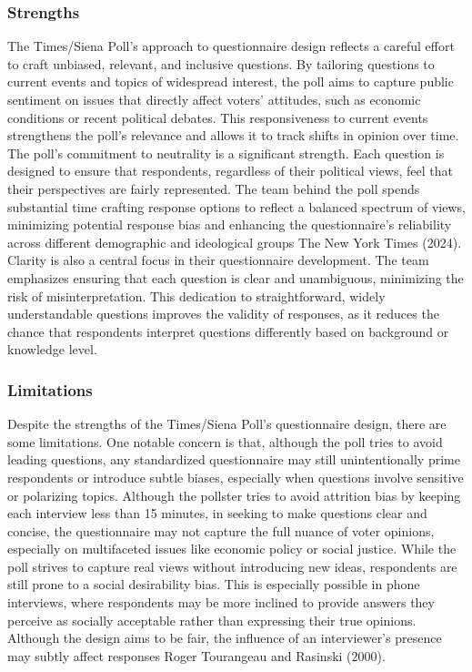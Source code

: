 \documentclass[
  letterpaper,
  DIV=11,
  numbers=noendperiod]{scrartcl}
\begin{document}
\hypertarget{strengths}{%
\subsubsection{Strengths}\label{strengths}}

The Times/Siena Poll's approach to questionnaire design reflects a
careful effort to craft unbiased, relevant, and inclusive questions. By
tailoring questions to current events and topics of widespread interest,
the poll aims to capture public sentiment on issues that directly affect
voters' attitudes, such as economic conditions or recent political
debates. This responsiveness to current events strengthens the poll's
relevance and allows it to track shifts in opinion over time. The poll's
commitment to neutrality is a significant strength. Each question is
designed to ensure that respondents, regardless of their political
views, feel that their perspectives are fairly represented. The team
behind the poll spends substantial time crafting response options to
reflect a balanced spectrum of views, minimizing potential response bias
and enhancing the questionnaire's reliability across different
demographic and ideological groups The New York Times (2024). Clarity is
also a central focus in their questionnaire development. The team
emphasizes ensuring that each question is clear and unambiguous,
minimizing the risk of misinterpretation. This dedication to
straightforward, widely understandable questions improves the validity
of responses, as it reduces the chance that respondents interpret
questions differently based on background or knowledge level.

\hypertarget{limitations}{%
\subsubsection{Limitations}\label{limitations}}

Despite the strengths of the Times/Siena Poll's questionnaire design,
there are some limitations. One notable concern is that, although the
poll tries to avoid leading questions, any standardized questionnaire
may still unintentionally prime respondents or introduce subtle biases,
especially when questions involve sensitive or polarizing topics.
Although the pollster tries to avoid attrition bias by keeping each
interview less than 15 minutes, in seeking to make questions clear and
concise, the questionnaire may not capture the full nuance of voter
opinions, especially on multifaceted issues like economic policy or
social justice. While the poll strives to capture real views without
introducing new ideas, respondents are still prone to a social
desirability bias. This is especially possible in phone interviews,
where respondents may be more inclined to provide answers they perceive
as socially acceptable rather than expressing their true opinions.
Although the design aims to be fair, the influence of an interviewer's
presence may subtly affect responses Roger Tourangeau and Rasinski
(2000).
\end{document}
